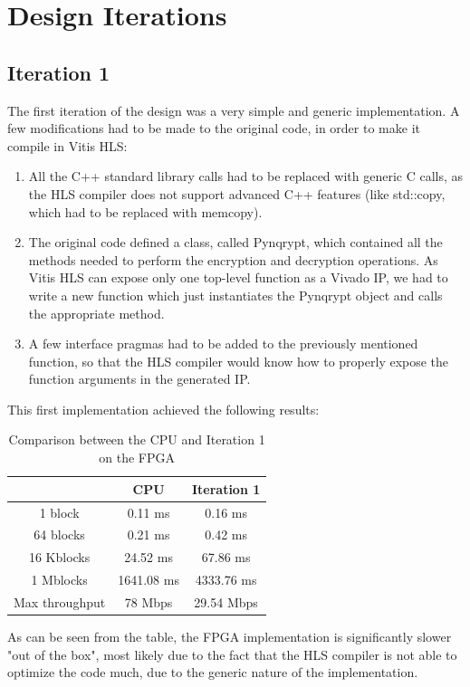 \documentclass[12pt,oneside,a4paper]{article}
\begin{document}
\section{Design Iterations} \label{sec:iterations}

\subsection{Iteration 1} \label{subsec:iter1}
The first iteration of the design was a very simple and generic implementation. A few modifications had to be made to the original code, in order to make it compile in Vitis HLS:
\begin{enumerate}
	\item All the C++ standard library calls had to be replaced with generic C calls, as the HLS compiler does not support advanced C++ features (like std::copy, which had to be replaced with memcopy).
	\item The original code defined a class, called Pynqrypt, which contained all the methods needed to perform the encryption and decryption operations. As Vitis HLS can expose only one top-level function as a Vivado IP, we had to write a new function which just instantiates the Pynqrypt object and calls the appropriate method.
	\item A few interface pragmas had to be added to the previously mentioned function, so that the HLS compiler would know how to properly expose the function arguments in the generated IP.
\end{enumerate}

This first implementation achieved the following results:
\begin{table}[h!]
	\centering
	\begin{tabular}{ccc}
		\toprule
		 & CPU & Iteration 1 \\
		\midrule
		1 block & 0.11 ms & 0.16 ms \\
		64 blocks & 0.21 ms & 0.42 ms \\
		16 Kblocks & 24.52 ms & 67.86 ms \\
		1 Mblocks & 1641.08 ms & 4333.76 ms \\
		Max throughput & 78 Mbps & 29.54 Mbps \\
		\bottomrule
	\end{tabular}
	\caption{Comparison between the CPU and Iteration 1 on the FPGA}
\end{table}

As can be seen from the table, the FPGA implementation is significantly slower "out of the box", most likely due to the fact that the HLS compiler is not able to optimize the code much, due to the generic nature of the implementation.  
\end{document}
